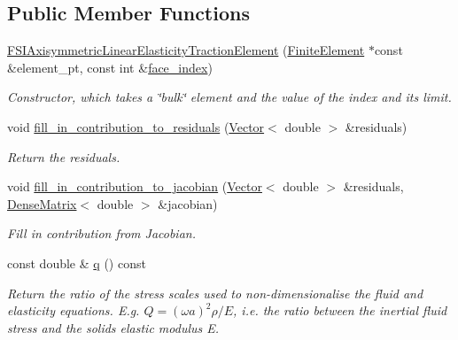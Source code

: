 \subsection*{Public Member Functions}
\begin{DoxyCompactItemize}
\item 
\hyperlink{classoomph_1_1FSIAxisymmetricLinearElasticityTractionElement_a1c6b3d25b6867c98666130df0a150433}{F\+S\+I\+Axisymmetric\+Linear\+Elasticity\+Traction\+Element} (\hyperlink{classoomph_1_1FiniteElement}{Finite\+Element} $\ast$const \&element\+\_\+pt, const int \&\hyperlink{classoomph_1_1FaceElement_a478d577ac6db67ecc80f1f02ae3ab170}{face\+\_\+index})
\begin{DoxyCompactList}\small\item\em Constructor, which takes a \char`\"{}bulk\char`\"{} element and the value of the index and its limit. \end{DoxyCompactList}\item 
void \hyperlink{classoomph_1_1FSIAxisymmetricLinearElasticityTractionElement_a1b263d681ce9db54b6439eec04a60080}{fill\+\_\+in\+\_\+contribution\+\_\+to\+\_\+residuals} (\hyperlink{classoomph_1_1Vector}{Vector}$<$ double $>$ \&residuals)
\begin{DoxyCompactList}\small\item\em Return the residuals. \end{DoxyCompactList}\item 
void \hyperlink{classoomph_1_1FSIAxisymmetricLinearElasticityTractionElement_ac2ec9591abe96af1cc68da123c554feb}{fill\+\_\+in\+\_\+contribution\+\_\+to\+\_\+jacobian} (\hyperlink{classoomph_1_1Vector}{Vector}$<$ double $>$ \&residuals, \hyperlink{classoomph_1_1DenseMatrix}{Dense\+Matrix}$<$ double $>$ \&jacobian)
\begin{DoxyCompactList}\small\item\em Fill in contribution from Jacobian. \end{DoxyCompactList}\item 
const double \& \hyperlink{classoomph_1_1FSIAxisymmetricLinearElasticityTractionElement_a7f934810722cf9109bfec4c063671ce5}{q} () const
\begin{DoxyCompactList}\small\item\em Return the ratio of the stress scales used to non-\/dimensionalise the fluid and elasticity equations. E.\+g. $ Q = (\omega a)^2 \rho/E $, i.\+e. the ratio between the inertial fluid stress and the solid\textquotesingle{}s elastic modulus E. \end{DoxyCompactList}\item 

\end{DoxyCompactItemize}
